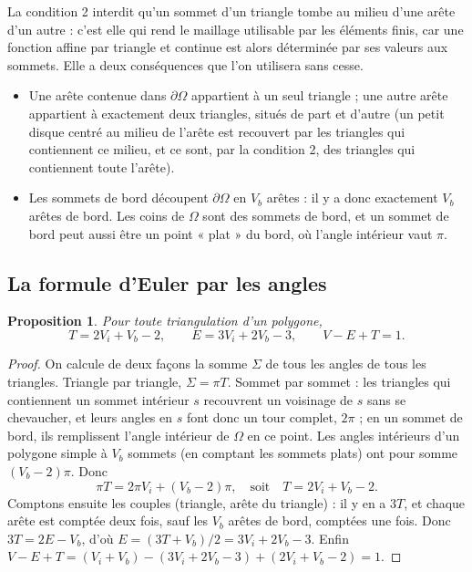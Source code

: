 \documentclass[11pt,a4paper]{article}
\theoremstyle{plain}
\newtheorem{proposition}[theoreme]{Proposition}
\theoremstyle{definition}
\theoremstyle{remark}
\begin{document}
La condition 2 interdit qu'un sommet d'un triangle tombe au milieu d'une arête d'un autre : c'est elle qui rend le maillage utilisable par les éléments finis, car une fonction affine par triangle et continue est alors déterminée par ses valeurs aux sommets. Elle a deux conséquences que l'on utilisera sans cesse.
\begin{itemize}[nosep]
\item Une arête contenue dans $\partial\Omega$ appartient à un seul triangle ; une autre arête appartient à exactement deux triangles, situés de part et d'autre (un petit disque centré au milieu de l'arête est recouvert par les triangles qui contiennent ce milieu, et ce sont, par la condition 2, des triangles qui contiennent toute l'arête).
\item Les sommets de bord découpent $\partial\Omega$ en $V_b$ arêtes : il y a donc exactement $V_b$ arêtes de bord. Les coins de $\Omega$ sont des sommets de bord, et un sommet de bord peut aussi être un point « plat » du bord, où l'angle intérieur vaut $\pi$.
\end{itemize}

\subsection{La formule d'Euler par les angles}

\begin{proposition}\label{prop:euler}
Pour toute triangulation d'un polygone,
\[
  T=2V_i+V_b-2,\qquad E=3V_i+2V_b-3,\qquad V-E+T=1.
\]
\end{proposition}

\begin{proof}
On calcule de deux façons la somme $\Sigma$ de tous les angles de tous les triangles. Triangle par triangle, $\Sigma=\pi T$. Sommet par sommet : les triangles qui contiennent un sommet intérieur $s$ recouvrent un voisinage de $s$ sans se chevaucher, et leurs angles en $s$ font donc un tour complet, $2\pi$ ; en un sommet de bord, ils remplissent l'angle intérieur de $\Omega$ en ce point. Les angles intérieurs d'un polygone simple à $V_b$ sommets (en comptant les sommets plats) ont pour somme $(V_b-2)\pi$. Donc
\[
  \pi T=2\pi V_i+(V_b-2)\pi,\quad\text{soit}\quad T=2V_i+V_b-2.
\]
Comptons ensuite les couples (triangle, arête du triangle) : il y en a $3T$, et chaque arête est comptée deux fois, sauf les $V_b$ arêtes de bord, comptées une fois. Donc $3T=2E-V_b$, d'où $E=(3T+V_b)/2=3V_i+2V_b-3$. Enfin $V-E+T=(V_i+V_b)-(3V_i+2V_b-3)+(2V_i+V_b-2)=1$.
\end{proof}
\end{document}

